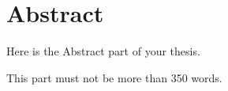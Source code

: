 \thispagestyle{plain}
\chapter*{\hfill \normalsize{Abstract} \hfill}

Here is the Abstract part of your thesis.

This part must not be more than 350 words.

\vfill
